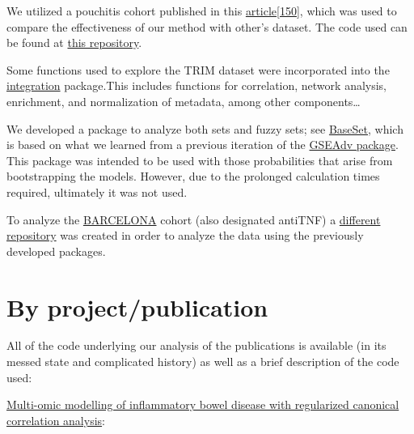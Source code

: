 \documentclass[
  12pt,
  a4paper,
  twoside,
  openright]{book}
\begin{document}
We utilized a pouchitis cohort published in this \href{https://dx.doi.org/10.1186/s13059-015-0637-x}{article}{[}\protect\hyperlink{ref-morgan2015}{150}{]}, which was used to compare the effectiveness of our method with other's dataset.
The code used can be found at \href{https://github.com/llrs/pouchitis}{this repository}.

Some functions used to explore the TRIM dataset were incorporated into the \href{https://github.com/llrs/integration-helper}{integration} package.This includes functions for correlation, network analysis, enrichment, and normalization of metadata, among other components\ldots{}

We developed a package to analyze both sets and fuzzy sets; see \href{https://github.com/rOpenSci/BaseSet}{BaseSet}, which is based on what we learned from a previous iteration of the \href{https://github.com/llrs/GSEAdv}{GSEAdv package}.
This package was intended to be used with those probabilities that arise from bootstrapping the models.
However, due to the prolonged calculation times required, ultimately it was not used.

To analyze the \protect\hyperlink{acronyms_BARCELONA}{BARCELONA} cohort (also designated antiTNF) a \href{https://github.com/llrs/Barcelona}{different repository} was created in order to analyze the data using the previously developed packages.

\hypertarget{by-projectpublication}{%
\section{By project/publication}\label{by-projectpublication}}

All of the code underlying our analysis of the publications is available (in its messed state and complicated history) as well as a brief description of the code used:

\href{https://journals.plos.org/plosone/article?id=10.1371/journal.pone.0246367}{Multi-omic modelling of inflammatory bowel disease with regularized canonical correlation analysis}:
\end{document}
